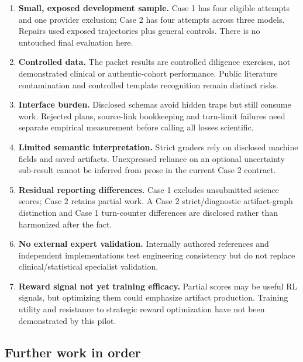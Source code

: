 \documentclass[11pt,a4paper]{article}
\begin{document}
\begin{enumerate}
\item \textbf{Small, exposed development sample.} Case 1 has four eligible attempts and one provider exclusion; Case 2 has four attempts across three models. Repairs used exposed trajectories plus general controls. There is no untouched final evaluation here.
\item \textbf{Controlled data.} The packet results are controlled diligence exercises, not demonstrated clinical or authentic-cohort performance. Public literature contamination and controlled template recognition remain distinct risks.
\item \textbf{Interface burden.} Disclosed schemas avoid hidden traps but still consume work. Rejected plans, source-link bookkeeping and turn-limit failures need separate empirical measurement before calling all losses scientific.
\item \textbf{Limited semantic interpretation.} Strict graders rely on disclosed machine fields and saved artifacts. Unexpressed reliance on an optional uncertainty sub-result cannot be inferred from prose in the current Case 2 contract.
\item \textbf{Residual reporting differences.} Case 1 excludes unsubmitted science scores; Case 2 retains partial work. A Case 2 strict/diagnostic artifact-graph distinction and Case 1 turn-counter differences are disclosed rather than harmonized after the fact.
\item \textbf{No external expert validation.} Internally authored references and independent implementations test engineering consistency but do not replace clinical/statistical specialist validation.
\item \textbf{Reward signal not yet training efficacy.} Partial scores may be useful RL signals, but optimizing them could emphasize artifact production. Training utility and resistance to strategic reward optimization have not been demonstrated by this pilot.
\end{enumerate}

\subsection{Further work in order}
\end{document}
